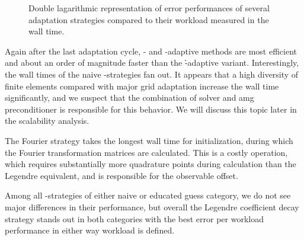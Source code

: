 \begin{figure}
\centering
%
%  
\caption{Double lagarithmic representation of error performances of several adaptation strategies compared to their workload measured in the wall time.}
\label{fig:errorwalltime}
\end{figure}


Again after the last adaptation cycle, \p- and \hp-adaptive methods are most efficient and about an order of magnitude faster than the \h-adaptive variant. Interestingly, the wall times of the naive \hp-strategies fan out. It appears that a high diversity of finite elements compared with major grid adaptation increase the wall time significantly, and we suspect that the combination of solver and \gls{amg} preconditioner is responsible for this behavior. We will discuss this topic later in the scalability analysis.

The Fourier strategy takes the longest wall time for initialization, during which the Fourier transformation matrices are calculated. This is a costly operation, which requires substantially more quadrature points during calculation than the Legendre equivalent, and is responsible for the observable offset.

Among all \hp-strategies of either naive or educated guess category, we do not see major differences in their performance, but overall the Legendre coefficient decay strategy stands out in both categories with the best error per workload performance in either way workload is defined.



